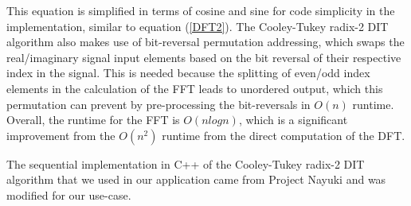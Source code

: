 \documentclass[journal]{IEEEtran}
\begin{document}
	\par{
		This equation is simplified in terms of cosine and sine for code
		simplicity in the implementation, similar to equation (\ref{DFT2}).
		The Cooley-Tukey radix-2 DIT algorithm also makes
		use of bit-reversal permutation addressing, which swaps the
		real/imaginary signal input elements based on the bit reversal of their
		respective index in the signal. This is needed because the splitting
		of even/odd index elements in the calculation of the FFT leads to 
		unordered output, which this permutation can prevent by pre-processing
		the bit-reversals in $O(n)$ runtime. Overall, the runtime for the
		FFT is $O(nlogn)$, which is a significant improvement from the $O(n^2)$
		runtime from the direct computation of the DFT.

		The sequential implementation in C++ of the Cooley-Tukey radix-2 DIT
		algorithm that we used in our application came from Project Nayuki 
		\cite{Nayuki} and was modified for our use-case.
	}
\end{document}
